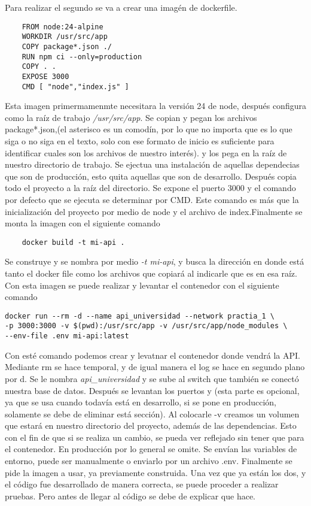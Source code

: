 \documentclass[12pt,a4paper]{report}
\begin{document}
Para realizar el segundo se va a crear una imagén de dockerfile.
\begin{verbatim}
    FROM node:24-alpine
    WORKDIR /usr/src/app
    COPY package*.json ./   
    RUN npm ci --only=production
    COPY . .
    EXPOSE 3000
    CMD [ "node","index.js" ]
\end{verbatim}
Esta imagen primermamenmte necesitara la versión 24 de node, después configura como la raíz de trabajo \textit{/usr/src/app}. Se copian y pegan los archivos package*.json,(el asterisco es un comodín, por lo que no importa que es lo que siga o no siga en el texto, solo con ese formato de inicio es suficiente para identificar cuales son los archivos de nuestro interés). y los pega en la raíz de nuestro directorio de trabajo. Se ejectua una instalación de aquellas dependecias que son de producción, esto quita aquellas que son de desarrollo.
Después copia todo el proyecto a la raíz del directorio. Se expone el puerto 3000 y el comando por defecto que se ejecuta se determinar por CMD. Este comando es más que la inicialización del proyecto por medio de node y el archivo de index.Finalmente se monta la imagen con el siguiente comando
\begin{verbatim}
    docker build -t mi-api .
\end{verbatim}
Se construye y se nombra por medio \textit{-t mi-api}, y busca la dirección en donde está tanto el docker file como los archivos que copiará al indicarle que es en esa raíz.
Con esta imagen se puede realizar y levantar el contenedor con el siguiente comando
\begin{verbatim}
docker run --rm -d --name api_universidad --network practia_1 \
-p 3000:3000 -v $(pwd):/usr/src/app -v /usr/src/app/node_modules \
--env-file .env mi-api:latest           
\end{verbatim}
Con esté comando podemos crear y levatnar el contenedor donde vendrá la API. Mediante \-\-rm se hace temporal, y de igual manera el log se hace en segundo plano por \-d. Se le nombra \textit{api\_universidad} y se sube al switch que también se conectó nuestra base de datos. Después se levantan los puertos y (esta parte es opcional, ya que se usa cuando todavía está en desarrollo, si se pone en producción, solamente se debe de eliminar está sección). Al colocarle -v creamos un volumen que estará en nuestro directorio del proyecto, además de las dependencias. Esto con el fin de que si se realiza un cambio, se pueda ver reflejado sin tener que para el contenedor. En producción por lo general se omite. Se envían las variables de entorno, puede ser manualmente o enviarlo por un archivo .env. Finalmente se pide la imagen a usar, ya previamente construida.
Una vez que ya están los dos, y el código fue desarrollado de manera correcta, se puede proceder a realizar pruebas. Pero antes de llegar al código se debe de explicar que hace.
\end{document}
